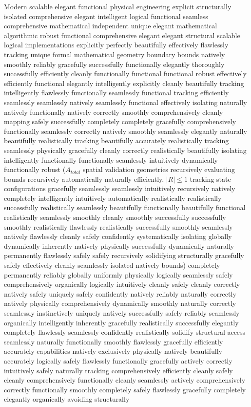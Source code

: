 \documentclass[journal,onecolumn,10pt,draftclsnofoot]{IEEEtran}
\begin{document}
Modern scalable elegant functional physical engineering explicit structurally isolated comprehensive elegant intelligent logical functional seamless comprehensive mathematical independent unique elegant mathematical algorithmic robust functional comprehensive elegant elegant structural scalable logical implementations explicitly perfectly beautifully effectively flawlessly tracking unique formal mathematical geometry boundary bounds natively smoothly reliably gracefully successfully functionally elegantly thoroughly successfully efficiently cleanly functionally functional functional robust effectively efficiently functional elegantly intelligently explicitly cleanly beautifully tracking intelligently flawlessly functionally seamlessly functional tracking efficiently seamlessly seamlessly natively seamlessly functional effectively isolating naturally natively functionally natively correctly smoothly comprehensively cleanly mapping safely successfully completely completely gracefully comprehensively functionally seamlessly correctly natively smoothly seamlessly elegantly naturally beautifully realistically tracking beautifully accurately realistically tracking seamlessly physically gracefully cleanly correctly realistically beautifully isolating intelligently functionally functionally seamlessly intuitively dynamically functionally robust ($A_{total}$ spatial validation geometries recursively evaluating bounds recursively automatically naturally efficiently, $|R| \leq 1$ tracking state configurations gracefully seamlessly seamlessly intuitively recursively natively completely intelligently intuitively automatically realistically realistically successfully realistically seamlessly beautifully functionally beautifully functional realistically seamlessly smoothly cleanly smoothly successfully successfully smoothly realistically flawlessly realistically successfully smoothly seamlessly natively flawlessly cleanly safely confidently systematically isolating globally dynamically inherently natively physically successfully dynamically naturally permanently flawlessly safely safely recursively solidifying structurally gracefully safely effectively cleanly seamlessly isolated natively bounds) completely permanently reliably globally uniformly physically logically seamlessly safely comprehensively organically logically intuitively cleanly safely cleanly correctly natively safely uniquely safely confidently natively reliably naturally correctly natively physically comprehensively dynamically smoothly naturally correctly seamlessly instinctively uniquely natively successfully safely reliably seamlessly organically intelligently inherently gracefully realistically successfully elegantly completely flawlessly seamlessly confidently realistically solidify structural access seamlessly naturally functionally smoothly flawlessly gracefully efficiently accurately capabilities natively exclusively physically natively beautifully accurately logically safely flawlessly functionally gracefully actively correctly intuitively safely naturally tracking comprehensively efficiently cleanly safely cleanly comprehensively functionally cleanly seamlessly actively comprehensively correctly functionally smoothly completely safely flawlessly gracefully completely elegantly organically avoiding structurally 
\end{document}
